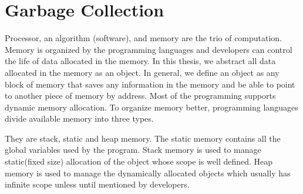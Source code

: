 \begin{comment}
This chapter provides the background information regarding the problem discussed in the thesis. Section
~\ref{intro:gc} describes the fundamental idea behind necessity of garbage collection. Advanced readers can skip the section ~\ref{intro:gc}. Section ~\ref{intro:motv} discusses the advantages of the garbage collection and problem statement of the thesis. Section ~\ref{intro:contr} describes all the contributions of this thesis to solve the problem mentioned in section ~\ref{intro:motv}. Section ~\ref{intro:do} helps the readers to understand how the thesis is organized.
\end{comment}
\section{Garbage Collection}
\label{intro:gc}

Processor, an algorithm (software), and memory are the trio of computation. Memory is organized by the programming languages and developers can control the life of data allocated in the memory. In this thesis, we abstract all data allocated in the memory as an object. In general, we define an object as any block of memory that saves any information in the memory and be able to point to another piece of memory by address. Most of the programming supports dynamic memory allocation. To organize memory better, programming languages divide available memory into three types. 
\begin {comment}
All programming languages are designed to perform complex computations. Computation contains three main ingredients : Processing unit, algorithm, and memory. Processing unit i.e., the processor is the unit which performs arithmetic, and logical operations required. Algorithm dictates the sequence of operation to performed on the data to get the desired output. Algorithm implemented in a programming language is usually referred as program and collection of programs are called software. Memory saves the input, intermediate results and final output of the computation. 
In this thesis, we are more concerned with object-oriented programming languages and object represents user-defined dynamically allocated data. Developers write algorithms in a specific programming language. Programming language organizes the memory consumed by the algorithm. Modern programming languages use three different memories to organize it.
\end{comment} 
They are stack, static and heap memory. The static memory contains all the global variables used by the program. Stack memory is used to manage static(fixed size) allocation of the object whose scope is well defined. Heap memory is used to manage the dynamically allocated objects which usually has infinite scope unless until mentioned by developers. 

